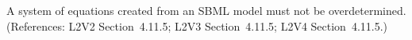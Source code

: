 A system of equations created from an SBML model must not be
overdetermined.  (References: L2V2 Section~4.11.5; L2V3
Section~4.11.5; L2V4 Section~4.11.5.)
